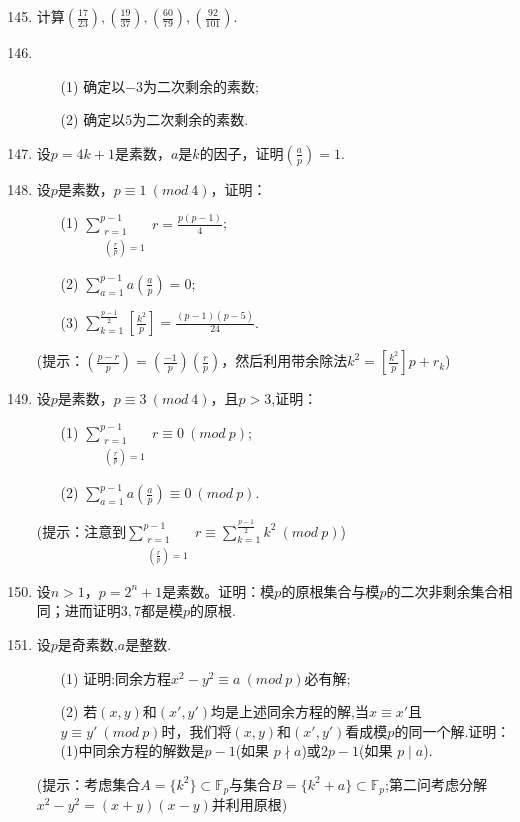 \documentclass[a4paper,12pt]{article}
\begin{document}
\begin{enumerate}\setcounter{enumi}{144}
 \item 计算$(\frac{17}{23}),(\frac{19}{37}),(\frac{60}{79}),(\frac{92}{101})$.

 \item \begin{enumerate}
    \item[(1)] 确定以$-3$为二次剩余的素数;
    \item[(2)] 确定以$5$为二次剩余的素数.
 \end{enumerate}

 \item 设$p=4k+1$是素数，$a$是$k$的因子，证明$(\frac{a}{p})=1$.

 \item 设$p$是素数，$p\equiv1\ (mod\ 4)$，证明：
 \begin{itemize}
 \item[(1)] $\sum\limits_{\substack{r=1\\(\frac{r}{p})=1}}^{p-1}r=\frac{p(p-1)}{4}$;
 \item[(2)] $\sum\limits_{a=1}^{p-1}a(\frac{a}{p})=0$;
 \item[(3)] $\sum\limits_{k=1}^{\frac{p-1}{2}}[\frac{k^2}{p}]=\frac{(p-1)(p-5)}{24}$.
 \end{itemize}
 (提示：$(\frac{p-r}{p})=(\frac{-1}{p})(\frac{r}{p})$，然后利用带余除法$k^2=[\frac{k^2}{p}]p+r_k$)
 
 \item 设$p$是素数，$p\equiv 3\ (mod\ 4)$，且$p>3$,证明：
 \begin{itemize}
 \item[(1)] $\sum\limits_{\substack{r=1\\(\frac{r}{p})=1}}^{p-1}r\equiv0\ (mod\ p)$;
 \item[(2)] $\sum\limits_{a=1}^{p-1}a(\frac{a}{p})\equiv0\ (mod\ p)$.
 \end{itemize}
 (提示：注意到$\sum\limits_{\substack{r=1\\(\frac{r}{p})=1}}^{p-1}r\equiv\sum\limits_{k=1}^{\frac{p-1}{2}}k^2\ (mod\ p)$)

 \item 设$n>1$，$p=2^n+1$是素数。证明：模$p$的原根集合与模$p$的二次非剩余集合相同；进而证明$3,7$都是模$p$的原根.

 \newpage
 \item 设$p$是奇素数,$a$是整数.
 \begin{itemize}
 \item[(1)] 证明:同余方程$x^2-y^2\equiv a\ (mod\ p)$必有解;
 \item[(2)] 若$(x,y)$和$(x',y')$均是上述同余方程的解,当$x\equiv x'$且$y\equiv y'\ (mod\ p)$时，我们将$(x,y)$和$(x',y')$看成模$p$的同一个解.证明：(1)中同余方程的解数是$p-1$(如果 $p\nmid a$)或$2p-1$(如果 $p\mid a$).
 \end{itemize}
 (提示：考虑集合$A=\{k^2\}\subset \mathbb{F}_p$与集合$B=\{k^2+a\}\subset \mathbb{F}_p$;第二问考虑分解$x^2-y^2=(x+y)(x-y)$并利用原根)


\end{enumerate}
\end{document}
